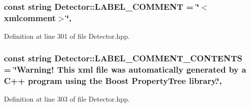 \hypertarget{classmultiscale_1_1analysis_1_1Detector_a561d5a58b94e4ccce28726c98f6ca71e}{
\subsubsection[{L\-A\-B\-E\-L\-\_\-\-C\-O\-M\-M\-E\-N\-T}]{\setlength{\rightskip}{0pt plus 5cm}const string Detector\-::\-L\-A\-B\-E\-L\-\_\-\-C\-O\-M\-M\-E\-N\-T = \char`\"{}$<$xmlcomment$>$\char`\"{}\hspace{0.3cm}{\ttfamily [static]}, {\ttfamily [protected]}}}\label{classmultiscale_1_1analysis_1_1Detector_a561d5a58b94e4ccce28726c98f6ca71e}


Definition at line 301 of file Detector.\-hpp.

\hypertarget{classmultiscale_1_1analysis_1_1Detector_adf6527cf12c5267d28210a0a60ce43cf}{
\subsubsection[{L\-A\-B\-E\-L\-\_\-\-C\-O\-M\-M\-E\-N\-T\-\_\-\-C\-O\-N\-T\-E\-N\-T\-S}]{\setlength{\rightskip}{0pt plus 5cm}const string Detector\-::\-L\-A\-B\-E\-L\-\_\-\-C\-O\-M\-M\-E\-N\-T\-\_\-\-C\-O\-N\-T\-E\-N\-T\-S = \char`\"{}Warning! This xml file was automatically generated by a C++ program using the Boost Property\-Tree library.\char`\"{}\hspace{0.3cm}{\ttfamily [static]}, {\ttfamily [protected]}}}\label{classmultiscale_1_1analysis_1_1Detector_adf6527cf12c5267d28210a0a60ce43cf}


Definition at line 303 of file Detector.\-hpp.

